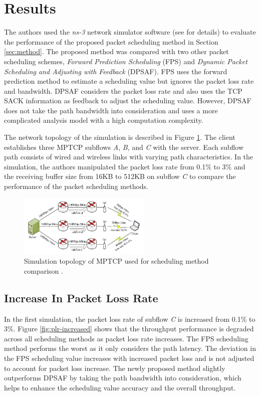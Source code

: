 \documentclass[sigplan,screen,nonacm]{acmart}
\begin{document}
\section{Results}
\label{sec:results}

The authors used the \emph{ns-3} network simulator software (see \cite{NewMethod:2018} for details) to evaluate the performance of the proposed packet scheduling method in Section \ref{sec:method}. The proposed method was compared with two other packet scheduling schemes, \emph{Forward Prediction Scheduling} (FPS) and \emph{Dynamic Packet Scheduling and Adjusting with Feedback} (DPSAF). FPS uses the forward prediction method to estimate a scheduling value but ignores the packet loss rate and bandwidth. DPSAF considers the packet loss rate and also uses the TCP SACK information as feedback to adjust the scheduling value. However, DPSAF does not take the path bandwidth into consideration and uses a more complicated analysis model with a high computation complexity.

The network topology of the simulation is described in Figure \ref{fig:ns3-model}. The client establishes three MPTCP subflows \emph{A}, \emph{B}, and \emph{C} with the server. Each subflow path consists of wired and wireless links with varying path characteristics. In the simulation, the authors manipulated the packet loss rate from 0.1\% to 3\% and the receiving buffer size from 16KB to 512KB on subflow \emph{C} to compare the performance of the packet scheduling methods.
\begin{figure}
\includegraphics[width=2.5in]{mptcp_paper/assets/ns3-model.png}
\caption{Simulation topology of MPTCP used for scheduling method comparison \cite{NewMethod:2018}.}
\label{fig:ns3-model}
\end{figure}
\subsection{Increase In Packet Loss Rate}
\label{sub:increase-plr}
In the first simulation, the packet loss rate of subflow \emph{C} is increased from 0.1\% to 3\%. Figure \ref{fig:plr-increased} shows that the throughput performance is degraded across all scheduling methods as packet loss rate increases. The FPS scheduling method performs the worst as it only considers the path latency. The deviation in the FPS scheduling value increases with increased packet loss and is not adjusted to account for packet loss increase. The newly proposed method slightly outperforms DPSAF by taking the path bandwidth into consideration, which helps to enhance the scheduling value accuracy and the overall throughput.
\end{document}
